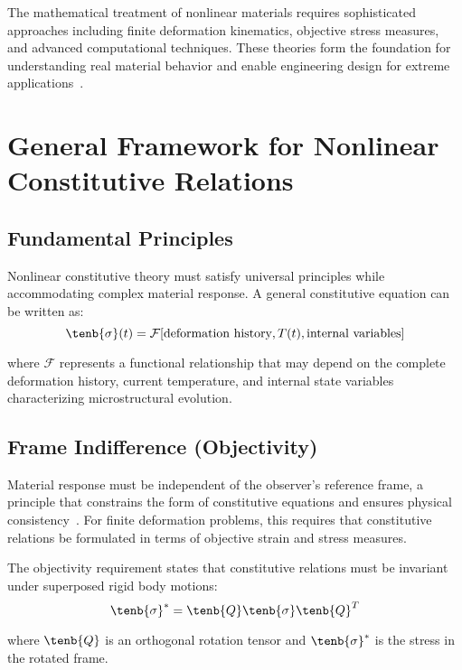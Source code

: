The mathematical treatment of nonlinear materials requires sophisticated approaches including finite deformation kinematics, objective stress measures, and advanced computational techniques. These theories form the foundation for understanding real material behavior and enable engineering design for extreme applications~\autocite{Sadd.2019}.

\section{General Framework for Nonlinear Constitutive Relations}

\subsection{Fundamental Principles}

Nonlinear constitutive theory must satisfy universal principles while accommodating complex material response. A general constitutive equation can be written as:
\begin{equation}
\tenb{\sigma}(t) = \mathcal{F}[\text{deformation history}, T(t), \text{internal variables}]
\end{equation}

where $\mathcal{F}$ represents a functional relationship that may depend on the complete deformation history, current temperature, and internal state variables characterizing microstructural evolution.

\subsection{Frame Indifference (Objectivity)}

Material response must be independent of the observer's reference frame, a principle that constrains the form of constitutive equations and ensures physical consistency~\autocite{Sadd.2019}. For finite deformation problems, this requires that constitutive relations be formulated in terms of objective strain and stress measures.

The objectivity requirement states that constitutive relations must be invariant under superposed rigid body motions:
\begin{equation}
\tenb{\sigma}^* = \tenb{Q} \tenb{\sigma} \tenb{Q}^T
\end{equation}

where $\tenb{Q}$ is an orthogonal rotation tensor and $\tenb{\sigma}^*$ is the stress in the rotated frame.

